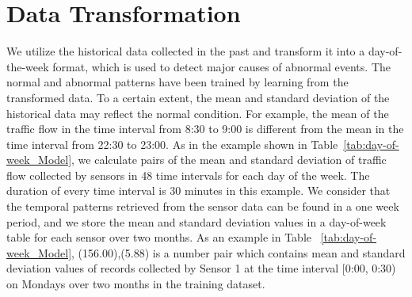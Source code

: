 \section{Data Transformation}\label{subsubsec:hm} 
We utilize the historical data collected in the past and transform it into a day-of-the-week format, which is used to detect major causes of abnormal events. The normal and abnormal patterns have been trained by learning from the transformed data. To a certain extent, the mean and standard deviation of the historical data may reflect the normal condition. For example, the mean of the traffic flow in the time interval from 8:30 to 9:00 is different from the mean in the time interval from 22:30 to 23:00. As in the example shown in Table~\ref{tab:day-of-week_Model}, we calculate pairs of the mean and standard deviation of traffic flow collected by sensors in 48 time intervals for each day of the week. The duration of every time interval is 30 minutes in this example.
We consider that the temporal patterns retrieved from the sensor data can be found in a one week period, and we store the mean and standard deviation values in a day-of-week table for each sensor over two months. As an example in Table ~\ref{tab:day-of-week_Model}, (156.00),(5.88) is a number pair which contains mean and standard deviation values of records collected by Sensor 1 at the time interval {[0:00, 0:30)} on Mondays over two months in the training dataset.



